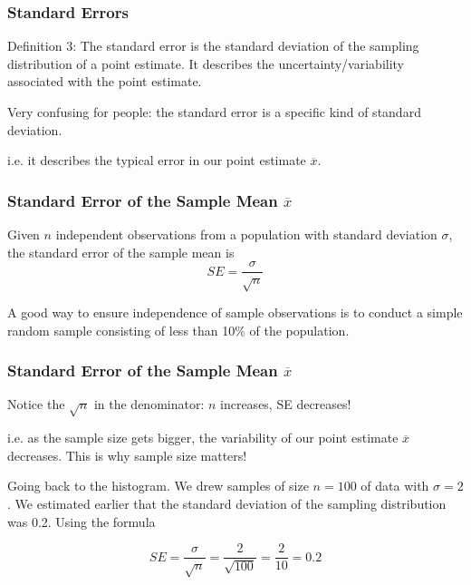 \documentclass[handout]{beamer}
\newcommand{\blue}[1]{\textcolor{blue2}{#1}}
\newcommand{\xbar}{\overline{x}}
\begin{document}
\begin{frame}[fragile]
\frametitle{Standard Errors}

\blue{Definition 3}: The \blue{standard error} is the standard deviation of the sampling distribution of a point estimate.  It describes the uncertainty/variability associated with the point estimate.  

\pause \vspace{0.5cm}

\blue{Very confusing for people}:  the \blue{standard error} is a specific kind of standard deviation.

\pause \vspace{0.5cm}
i.e. it describes the typical \blue{error} in our point estimate $\xbar$.


\end{frame}



\begin{frame}[fragile]
\frametitle{Standard Error of the Sample Mean $\xbar$}

Given $n$ \blue{independent} observations from a population with standard deviation $\sigma$, the \blue{standard error of the sample mean} is
\[
SE = \frac{\sigma}{\sqrt{n}}
\]

\pause A good way to ensure independence of sample observations is to conduct a simple random sample consisting of less than 10\% of the population.  

\end{frame}



\begin{frame}[fragile]
\frametitle{Standard Error of the Sample Mean $\xbar$}


Notice the $\sqrt{n}$ in the denominator: $n$ increases, SE decreases!\\

\pause \vspace{0.5cm}

i.e. as the sample size gets bigger, the variability of our point estimate $\xbar$ decreases.  This is why sample size matters!

\pause \vspace{0.5cm}

Going back to the histogram.  We drew samples of size $n=100$ of data with $\sigma=2$.  We estimated earlier that the standard deviation of the sampling distribution was 0.2.  Using the formula

\[
SE = \frac{\sigma}{\sqrt{n}} = \frac{2}{\sqrt{100}} = \frac{2}{10} = 0.2
\]
\end{frame}
\end{document}
